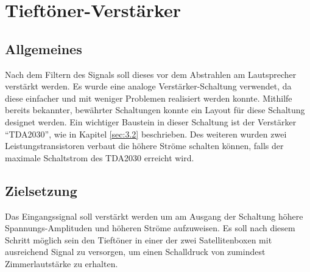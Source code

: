 \null\newpage
\section{Tieftöner-Verstärker}\label{sec:4.4}
\subsection{Allgemeines}\label{subsec:4.4.1}
Nach dem Filtern des Signals soll dieses vor dem Abstrahlen am Lautsprecher verstärkt werden. Es wurde eine analoge Verstärker-Schaltung verwendet, da diese einfacher und mit weniger Problemen realisiert werden konnte. Mithilfe bereits bekannter, bewährter Schaltungen konnte ein Layout für diese Schaltung designet werden. Ein wichtiger Baustein in dieser Schaltung ist der Verstärker \enquote{TDA2030}, wie in Kapitel \ref{sec:3.2} beschrieben.  Des weiteren wurden zwei Leistungstransistoren verbaut die höhere Ströme schalten können, falls der maximale Schaltstrom des TDA2030 erreicht wird.

\subsection{Zielsetzung}\label{subsec:4.4.2}
Das Eingangssignal soll verstärkt werden um am Ausgang der Schaltung höhere Spannungs-Amplituden und höheren Ströme aufzuweisen. Es soll nach diesem Schritt möglich sein den Tieftöner in einer der zwei Satellitenboxen mit ausreichend Signal zu versorgen, um einen Schalldruck von zumindest Zimmerlautstärke zu erhalten. 

